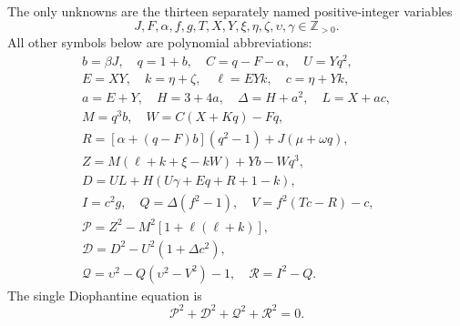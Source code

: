 The only unknowns are the thirteen separately named positive-integer variables
\[
J,F,\alpha,f,g,T,X,Y,\xi,\eta,\zeta,\upsilon,\gamma\in\mathbb Z_{>0}.
\]
All other symbols below are polynomial abbreviations:
\[
\begin{gathered}
b=\beta J,\quad q=1+b,\quad C=q-F-\alpha,\quad U=Yq^2,\\
E=XY,\quad k=\eta+\zeta,\quad \ell=EYk,\quad c=\eta+Yk,\\
a=E+Y,\quad H=3+4a,\quad\Delta=H+a^2,\quad L=X+ac,\\
M=q^3b,\quad W=C(X+Kq)-Fq,\\
R=[\alpha+(q-F)b](q^2-1)+J(\mu+\omega q),\\
Z=M(\ell+k+\xi-kW)+Yb-Wq^3,\\
D=UL+H(U\gamma+Eq+R+1-k),\\
I=c^2g,\quad Q=\Delta(f^2-1),\quad V=f^2(Tc-R)-c,\\
\mathcal{P}=Z^2-M^2[1+\ell(\ell+k)],\\
\mathcal{D}=D^2-U^2(1+\Delta c^2),\\
\mathcal{Q}=\upsilon^2-Q(\upsilon^2-V^2)-1,\quad \mathcal{R}=I^2-Q.
\end{gathered}
\]
The single Diophantine equation is
\[
\boxed{\mathcal{P}^2+\mathcal{D}^2+\mathcal{Q}^2+\mathcal{R}^2=0.}
\]
